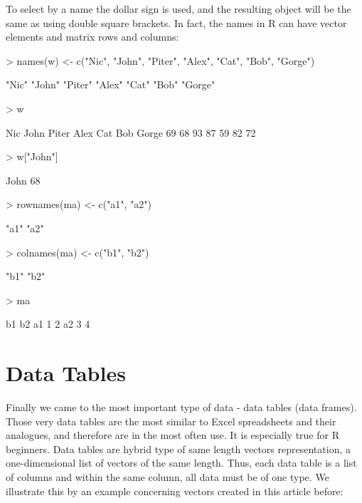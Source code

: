 \documentclass[a4paper,11pt]{scrartcl}
\begin{document}
To select by a name the dollar sign is used, and the resulting object will be the same as using double square brackets. In fact, the names in R can have vector elements and matrix rows and columns:

\begin{Schunk}
\begin{Sinput}
> names(w) <- c("Nic", "John", "Piter", "Alex", "Cat", "Bob", "Gorge")
\end{Sinput}
\begin{Soutput}
[1] "Nic"   "John"  "Piter" "Alex"  "Cat"   "Bob"   "Gorge"
\end{Soutput}
\begin{Sinput}
> w
\end{Sinput}
\begin{Soutput}
  Nic  John Piter  Alex   Cat   Bob Gorge 
   69    68    93    87    59    82    72 
\end{Soutput}
\begin{Sinput}
> w["John"]
\end{Sinput}
\begin{Soutput}
John 
  68 
\end{Soutput}
\begin{Sinput}
> rownames(ma) <- c("a1", "a2")
\end{Sinput}
\begin{Soutput}
[1] "a1" "a2"
\end{Soutput}
\begin{Sinput}
> colnames(ma) <- c("b1", "b2")
\end{Sinput}
\begin{Soutput}
[1] "b1" "b2"
\end{Soutput}
\begin{Sinput}
> ma
\end{Sinput}
\begin{Soutput}
   b1 b2
a1  1  2
a2  3  4
\end{Soutput}
\end{Schunk}

\section{Data Tables}
\label{sec:tables}

Finally we came to the most important type of data - data tables (data frames). Those very data tables are the most similar to Excel spreadsheets and their analogues, and therefore are in the most often use. It is especially true for R beginners. Data tables are hybrid type of same length vectors representation, a one-dimensional list of vectors of the same length. Thus, each data table is a list of columns and within the same column, all data must be of one type. We illustrate this by an example concerning vectors created in this article before:
\end{document}
